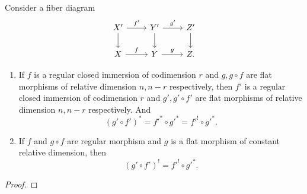   \begin{proposition}
    Consider a fiber diagram
    \[ \begin{tikzcd}
      X' \ar[r, "f'"] \ar[d] & Y' \ar[r, "g'"]  \ar[d] & Z'  \ar[d] \\
      X \ar[r, "f"] & Y \ar[r, "g"] & Z.
    \end{tikzcd} \]
    \begin{enumerate}
      \item If $f$ is a regular closed immersion of codimension $r$ and $g,g \circ f$ are flat morphisms of relative dimension $n,n-r$ respectively, 
        then $f'$ is a regular closed immersion of codimension $r$ and $g', g' \circ f'$ are flat morphisms of relative dimension $n,n-r$ respectively.
        And 
        \[ (g' \circ f')^* = f'^* \circ g'^* = f'^! \circ g'^* . \]
      \item If $f$ and $g \circ f$ are regular morphism and $g$ is a flat morphism of constant relative dimension, then 
        \[ (g' \circ f')^! = f'^! \circ g'^* . \]
    \end{enumerate}
  \end{proposition}
  \begin{proof}
    \Yang{}
  \end{proof}
